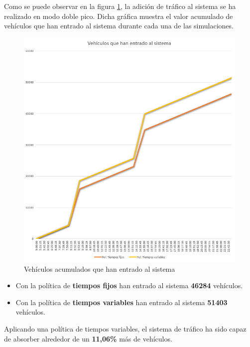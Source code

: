Como se puede observar en la figura \ref{fig:vehicles_in_city2}, la adición de tráfico al sistema se ha realizado en modo doble pico. Dicha gráfica muestra el valor acumulado de vehículos que han entrado al sistema durante cada una de las simulaciones.
\begin{figure}[H]
    \centering
    \includegraphics[width=0.80\linewidth]{text/image/SIMvehiclesInCITY2-CONFIG2.png}
    \caption{Vehículos acumulados que han entrado al sistema}
    \label{fig:vehicles_in_city2}
\end{figure}
\begin{itemize}
    \item Con la política de \textbf{tiempos fijos} han entrado al sistema \textbf{46284} vehículos.
    \item Con la política de \textbf{tiempos variables} han entrado al sistema \textbf{51403} vehículos.
\end{itemize}
Aplicando una política de tiempos variables, el sistema de tráfico ha sido capaz de absorber alrededor de un \textbf{11,06\%} más de vehículos.


